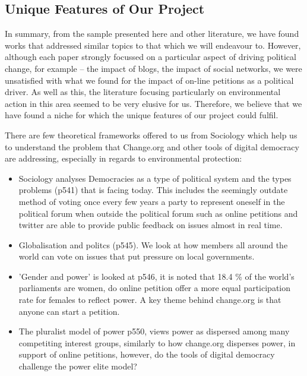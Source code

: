 \subsection{Unique Features of Our Project}
\label{sec:uniquefeatures}
In summary, from the sample presented here and other literature, we have found works that addressed similar topics to that which we will endeavour to. However, although each paper strongly focussed on a particular aspect of driving political change, for example -- the impact of blogs, the impact of social networks, we were unsatisfied with what we found for the impact of on-line petitions as a political driver. As well as this, the literature focusing particularly on environmental action in this area seemed to be very elusive for us. Therefore, we believe that we have found a niche for which the unique features of our project could fulfil. \par \vspace{0.2cm}
There are few theoretical frameworks offered to us from Sociology which help us to understand the problem that Change.org and other tools of digital democracy are addressing, especially in regards to environmental protection:

\begin{itemize}
  \item Sociology analyses Democracies as a type of political system and the types problems (p541) that is facing today. This includes the seemingly outdate method of voting once every few years a party to represent oneself in the political forum when outside the political forum such as online petitions and twitter are able to provide public feedback on issues almost in real time.
  \item Globalisation and politcs (p545). We look at how members all around the world can vote on issues that put pressure on local governments.
  \item 'Gender and power' is looked at p546, it is noted that 18.4 \% of the world's parliaments are women, do online petition offer a more equal participation rate for females to reflect power. A key theme behind change.org is that anyone can start a petition.
  \item The pluralist model of power p550, views power as dispersed among many competiting interest groups, similarly to how change.org disperses power, in support of online petitions, however, do the tools of digital democracy challenge the power elite model?
\end{itemize}


